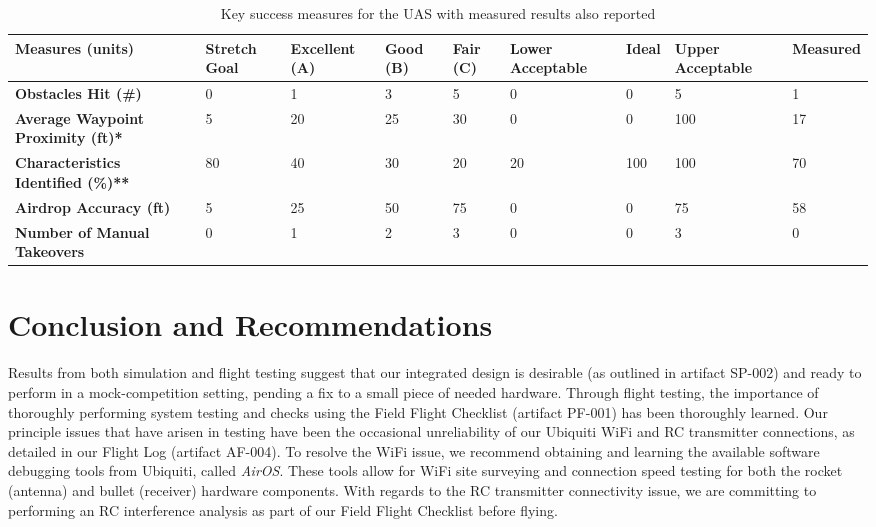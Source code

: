 \documentclass[]{auvsi_doc}
\begin{document}
\begin{table}[H]
	\centering
	\caption{Key success measures for the UAS with measured results also reported}\label{tab:key_measures}
\begin{tabular}{|P{3cm}|P{1.5cm}|P{1.5cm}|P{1.2cm}|P{1cm}|P{1.5cm}|P{1.2cm}|P{1.5cm}|P{1.5cm}}
	\hline
{}
	{\color[HTML]{000000} \textbf{Measures (units)}} & {\color[HTML]{000000}\textbf{Stretch Goal}} & {\color[HTML]{000000}\textbf{Excellent (A)}} & {\color[HTML]{000000}\textbf{Good (B)}} & {\color[HTML]{000000}\textbf{Fair (C)}} & {\color[HTML]{000000}\textbf{Lower Acceptable}} & {\color[HTML]{000000}\textbf{Ideal}} & {\color[HTML]{000000}\textbf{Upper Acceptable}} & {\color[HTML]{000000}\textbf{Measured}} \\
	\hline
	\textbf{Obstacles Hit (\#)} & 0 & 1 & 3 & 5 & 0 & 0 & 5 & 1 \\
	\hline
	\textbf{Average Waypoint Proximity (ft)*} & 5 & 20 & 25 & 30 & 0 & 0 & 100 & 17 \\
	\hline
	\textbf{Characteristics Identified (\%)**} & 80 & 40 & 30 & 20 & 20 & 100 & 100 & 70 \\
	\hline
	\textbf{Airdrop Accuracy (ft)} & 5 & 25 & 50 & 75 & 0 & 0 & 75 & 58 \\
	\hline
	\textbf{Number of Manual Takeovers} & 0 & 1 & 2 & 3 & 0 & 0 & 3 & 0\\
	\hline
\end{tabular}
\end{table}


\section{Conclusion and Recommendations}

Results from both simulation and flight testing suggest that our integrated design is desirable (as outlined in artifact SP-002) and ready to perform in a mock-competition setting, pending a fix to a small piece of needed hardware. Through flight testing, the importance of thoroughly performing system testing and checks using the Field Flight Checklist (artifact PF-001) has been thoroughly learned. Our principle issues that have arisen in testing have been the occasional unreliability of our Ubiquiti WiFi and RC transmitter connections, as detailed in our Flight Log (artifact AF-004). To resolve the WiFi issue, we recommend obtaining and learning the available software debugging tools from Ubiquiti, called \textit{AirOS}. These tools allow for WiFi site surveying and connection speed testing for both the rocket (antenna) and bullet (receiver) hardware components. With regards to the RC transmitter connectivity issue, we are committing to performing an RC interference analysis as part of our Field Flight Checklist before flying.
\end{document}
